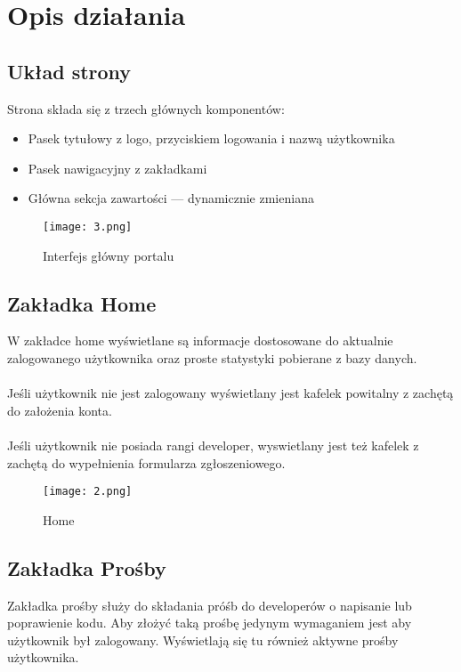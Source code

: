 \documentclass[a4paper,12pt]{article}
\begin{document}
\newpage

\section{Opis działania}

\subsection{Układ strony}
Strona składa się z trzech głównych komponentów:
\begin{itemize}
  \item Pasek tytułowy z logo, przyciskiem logowania i nazwą użytkownika
  \item Pasek nawigacyjny z zakładkami
  \item Główna sekcja zawartości — dynamicznie zmieniana
\end{itemize}

\begin{figure}[H]
    \centering
    \texttt{[image: 3.png]}
    \caption{Interfejs główny portalu}
\end{figure}

\newpage

\subsection{Zakładka Home}

W zakładce home wyświetlane są informacje dostosowane do aktualnie zalogowanego użytkownika oraz proste statystyki pobierane z bazy danych.\\\\
Jeśli użytkownik nie jest zalogowany wyświetlany jest kafelek powitalny z zachętą do założenia konta.\\\\
Jeśli użytkownik nie posiada rangi developer, wyswietlany jest też kafelek z zachętą do wypełnienia formularza zgłoszeniowego.

\begin{figure}[H]
    \centering
    \texttt{[image: 2.png]}
    \caption{Home}
\end{figure}

\newpage

\subsection{Zakładka Prośby}

Zakładka prośby służy do składania próśb do developerów o napisanie lub poprawienie kodu. Aby złożyć taką prośbę jedynym wymaganiem jest aby użytkownik był zalogowany. Wyświetlają się tu również aktywne prośby użytkownika.
\end{document}
